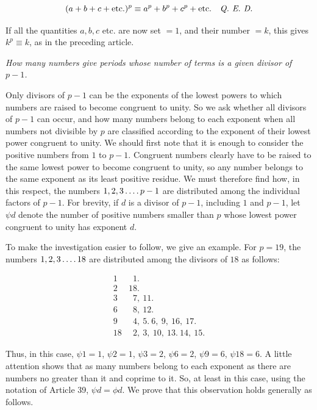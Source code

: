 \[(a+b+c+\mathrm{etc.})^p\equiv a^p+b^p+c^p+\mathrm{etc.}\quad\text{\emph{Q. E. D.}}\]

If all the quantities $a,b,c$ etc. are now set $=1$, and their number $=k$, this gives $k^p\equiv k$, as in the preceding article.

\begin{center}\emph{How many numbers give periods whose number of terms is a given divisor of $p-1$.}\end{center}


Only divisors of $p-1$ can be the exponents of the lowest powers to which numbers are raised to become congruent to unity. So we ask whether all divisors of $p-1$ can occur, and how many numbers belong to each exponent when all numbers not divisible by $p$ are classified according to the exponent of their lowest power congruent to unity. We should first note that it is enough to consider the positive numbers
from $1$ to $p-1$. Congruent numbers clearly have to be raised to the same lowest power to become congruent to unity, so any number belongs to the same exponent as its least positive residue. We must therefore find how, in this respect, the numbers $1,2,3\mathinner{\ldotp\ldotp\ldotp\ldotp} p-1$ are distributed among the individual factors of $p-1$. For brevity, if $d$ is a divisor of $p-1$, including $1$ and $p-1$, let $\psi d$ denote the number of positive numbers smaller than $p$ whose lowest power congruent to unity has exponent $d$.


To make the investigation easier to follow, we give an example. For $p=19$, the numbers $1,2,3\mathinner{\ldotp\ldotp\ldotp\ldotp}18$ are distributed among the divisors of $18$ as follows:

\[
\begin{array}{r|l}
1 & \phantom{1}1.\\
2 & 18.\\
3 & \phantom{1}7,\ 11.\\
6 & \phantom{1}8,\ 12.\\
9 & \phantom{1}4,\ 5.\ 6,\ 9,\ 16,\ 17.\\
18 & \phantom{1}2,\ 3,\ 10,\ 13.\ 14,\ 15.
\end{array}
\]

Thus, in this case, $\psi1=1$, $\psi2=1$, $\psi3=2$, $\psi6=2$, $\psi9=6$, $\psi18=6$. A little attention shows that as many numbers belong to each exponent as there are numbers no greater than it and coprime to it. So, at least in this case, using the notation of Article 39, $\psi d=\phi d$. We prove that this observation holds generally as follows.

